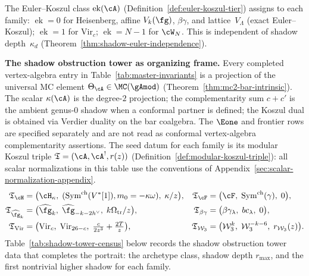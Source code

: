 \begin{remark}\label{rem:census-euler-koszul}
The Euler--Koszul class $\operatorname{ek}(\cA)$
(Definition~\ref{def:euler-koszul-tier}) assigns to each family:
$\operatorname{ek} = 0$ for Heisenberg, affine $V_k(\fg)$,
$\beta\gamma$, and lattice~$V_\Lambda$
(exact Euler--Koszul); $\operatorname{ek} = 1$ for $\mathrm{Vir}_c$;
$\operatorname{ek} = N{-}1$ for $\cW_N$.
This is independent of shadow depth~$\kappa_d$
(Theorem~\ref{thm:shadow-euler-independence}).
\end{remark}

\medskip

\noindent\textbf{The shadow obstruction tower as organizing frame.}
Every completed vertex-algebra entry in Table~\ref{tab:master-invariants}
is a projection of the universal MC element
$\Theta_\cA \in \MC(\gAmod)$
(Theorem~\ref{thm:mc2-bar-intrinsic}). The scalar $\kappa(\cA)$ is
the degree-$2$ projection; the complementarity sum $c + c'$ is the
ambient genus-$0$ shadow when a conformal partner is defined; the
Koszul dual is obtained via Verdier duality on the bar coalgebra.
The $\Eone$ and frontier rows are specified separately and are not read as
conformal vertex-algebra complementarity assertions.
The seed datum for each family is its modular Koszul triple
$\mathfrak{T} = (\cA, \cA^!, r(z))$
(Definition~\ref{def:modular-koszul-triple}):
all scalar normalizations in this table use the conventions of
Appendix~\ref{sec:scalar-normalization-appendix}.
\begin{equation}\label{eq:census-triples}
\begin{aligned}
\mathfrak{T}_{\cH}
 &= \bigl(\cH_\kappa,\;
 (\operatorname{Sym}^{\mathrm{ch}}(V^*[1]),m_0=-\kappa\omega),\;
 \kappa/z\bigr), &
\mathfrak{T}_{\cF}
 &= \bigl(\cF,\;
 \operatorname{Sym}^{\mathrm{ch}}(\gamma),\;
 0\bigr), \\
\mathfrak{T}_{\widehat{\fg}_k}
 &= \bigl(\widehat{\fg}_k,\;
 \widehat{\fg}_{-k-2h^\vee},\;
 k\Omega_{\mathrm{tr}}/z\bigr), &
\mathfrak{T}_{\beta\gamma}
 &= \bigl(\beta\gamma_\lambda,\;
 bc_\lambda,\;
 0\bigr), \\
\mathfrak{T}_{\mathrm{Vir}}
 &= \bigl(\mathrm{Vir}_c,\;
 \mathrm{Vir}_{26-c},\;
 \tfrac{c}{2z^3} + \tfrac{2T}{z}\bigr), &
\mathfrak{T}_{\mathcal{W}_3}
 &= \bigl(\mathcal{W}_3^k,\;
 \mathcal{W}_3^{-k-6},\;
 r_{\mathcal{W}_3}(z)\bigr).
\end{aligned}
\end{equation}
Table~\ref{tab:shadow-tower-census} below records the
shadow obstruction tower data that completes the portrait: the archetype class,
shadow depth $r_{\max}$, and the first nontrivial higher shadow for
each family.

